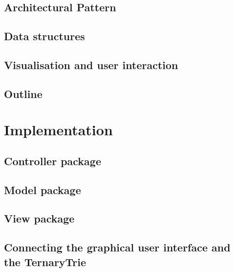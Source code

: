 \documentclass[a4paper,11pt]{article}
\begin{document}
\subsection{Architectural Pattern}
\label{sub:Design Pattern}


\subsection{Data structures}


\subsection{Visualisation and user interaction}


\subsection{Outline}


\pagebreak
\section{Implementation}
\label{sec:Implementation}


\subsection{Controller package} %


\subsection{Model package} %


\subsection{View package} %


\subsection{Connecting the graphical user interface and the TernaryTrie}

\end{document}
